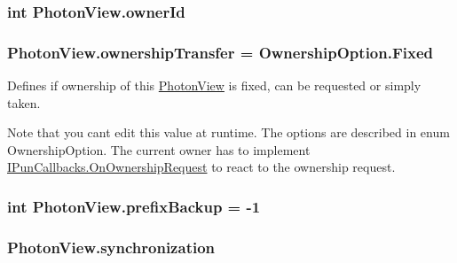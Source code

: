 \subsubsection[{\texorpdfstring{owner\+Id}{ownerId}}]{\setlength{\rightskip}{0pt plus 5cm}int Photon\+View.\+owner\+Id}\hypertarget{class_photon_view_af37a856ac051d3882de691851c7d2d08}{}\label{class_photon_view_af37a856ac051d3882de691851c7d2d08}
\subsubsection[{\texorpdfstring{ownership\+Transfer}{ownershipTransfer}}]{ Photon\+View.\+ownership\+Transfer = {\bf Ownership\+Option.\+Fixed}}\hypertarget{class_photon_view_a29400fef2cf398230b2c63a7d66f6d9a}{}\label{class_photon_view_a29400fef2cf398230b2c63a7d66f6d9a}


Defines if ownership of this \hyperlink{class_photon_view}{Photon\+View} is fixed, can be requested or simply taken. 

Note that you can\textquotesingle{}t edit this value at runtime. The options are described in enum Ownership\+Option. The current owner has to implement \hyperlink{interface_i_pun_callbacks_a02364f5144b6305bbffc886d530b7bd2}{I\+Pun\+Callbacks.\+On\+Ownership\+Request} to react to the ownership request. 
\subsubsection[{\texorpdfstring{prefix\+Backup}{prefixBackup}}]{\setlength{\rightskip}{0pt plus 5cm}int Photon\+View.\+prefix\+Backup = -\/1}\hypertarget{class_photon_view_a3a3650071e812aca9b9cd518638ebd7d}{}\label{class_photon_view_a3a3650071e812aca9b9cd518638ebd7d}
\subsubsection[{\texorpdfstring{synchronization}{synchronization}}]{ Photon\+View.\+synchronization}\hypertarget{class_photon_view_a634144e72774beb34d84c3ab7cac9cd4}{}\label{class_photon_view_a634144e72774beb34d84c3ab7cac9cd4}


